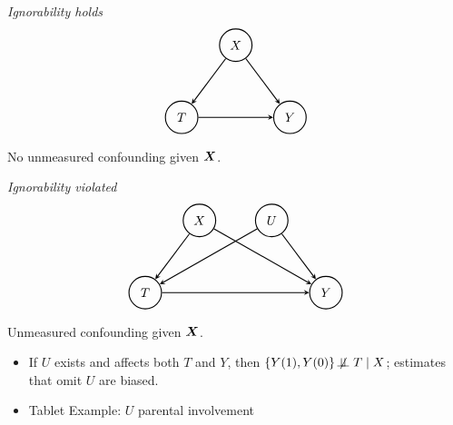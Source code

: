 \documentclass[11pt]{exam}
\begin{document}
    \begin{center}
\begin{minipage}{0.47\linewidth}
\centering
\textit{Ignorability holds}
\[
\begin{tikzpicture}[
    >=stealth,
    line width=0.8pt,
    every node/.style={circle, draw, minimum size=9mm, inner sep=0pt}
]
  \node (T) at (1,0)      {$T$};
  \node (Y) at (4,0)    {$Y$};
  \node (X) at (2.5, 2) {$X$};

  \draw[->] (X) -- (Y);
  \draw[->] (X) -- (T);
  \draw[->] (T) -- (Y);
\end{tikzpicture}
\]
No unmeasured confounding given $\bm{X}$.
\end{minipage}\hfill
\begin{minipage}{0.47\linewidth}
\centering
\textit{Ignorability violated}
\[
\begin{tikzpicture} [>=stealth,
    line width=0.8pt,
    every node/.style={circle, draw, minimum size=9mm, inner sep=0pt}]
  \node (T) at (1,0)      {$T$};
  \node (Y) at (6,0)    {$Y$};
  \node (X) at (2.5, 2) {$X$};
  \node (U) at (4.5, 2) {$U$};
  
  \draw[->] (X) -- (T);
  \draw[->] (X) -- (Y);
  \draw[->] (U) -- (T);
  \draw[->] (U) -- (Y);
  \draw[->] (T) -- (Y);
\end{tikzpicture}
\]
Unmeasured confounding given $\bm{X}$.
\end{minipage}
\end{center}
\begin{itemize}
    \item If \(U\) exists and affects both \(T\) and \(Y\), then \(\{Y(1),Y(0)\} \not\!\perp\!\!\!\perp T \mid X\); estimates that omit \(U\) are biased.
    \item Tablet Example: $U$ parental involvement
\end{itemize}

\end{document}
